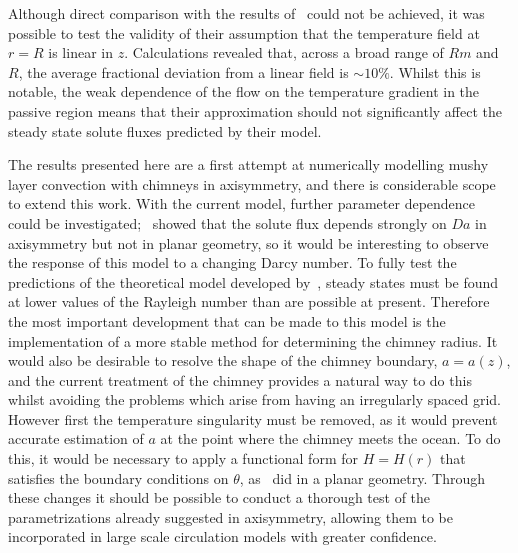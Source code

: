 \documentclass[11pt]{proc}
\begin{document}
Although direct comparison with the results of~\citet*{rees-jones-worster-13} could not be achieved, it was possible to test the validity of their assumption that the temperature field at $r=R$ is linear in $z$. Calculations revealed that, across a broad range of $Rm$ and $R$, the average fractional deviation from a linear field is $\sim10\%$. Whilst this is notable, the weak dependence of the flow on the temperature gradient in the passive region means that their approximation should not significantly  affect the steady state solute fluxes predicted by their model.

The results presented here are a first attempt at numerically modelling mushy layer convection with chimneys in axisymmetry, and there is considerable scope to extend this work. With the current model, further parameter dependence could be investigated;~\citet*{rees-jones-worster-13} showed that the solute flux depends strongly on $Da$ in axisymmetry but not in planar geometry, so it would be interesting to observe the response of this model to a changing Darcy number. To fully test the predictions of the theoretical model developed by~\citet*{rees-jones-worster-13}, steady states must be found at lower values of the Rayleigh number than are possible at present. Therefore the most important development that can be made to this model is the implementation of a more stable method for determining the chimney radius. It would also be desirable to resolve the shape of the chimney boundary, $a=a(z)$, and the current treatment of the chimney provides a natural way to do this whilst avoiding the problems which arise from having an irregularly spaced grid. However first the temperature singularity must be removed, as it would prevent accurate estimation of $a$ at the point where the chimney meets the ocean. To do this, it would be necessary to apply a functional form for $H = H(r)$ that satisfies the boundary conditions on $\theta$, as~\citet*{schulze-worster-98} did in a planar geometry. Through these changes it should be possible to conduct a thorough test of the parametrizations already suggested in axisymmetry, allowing them to be incorporated in large scale circulation models with greater confidence.

\newpage
{}
\end{document}
